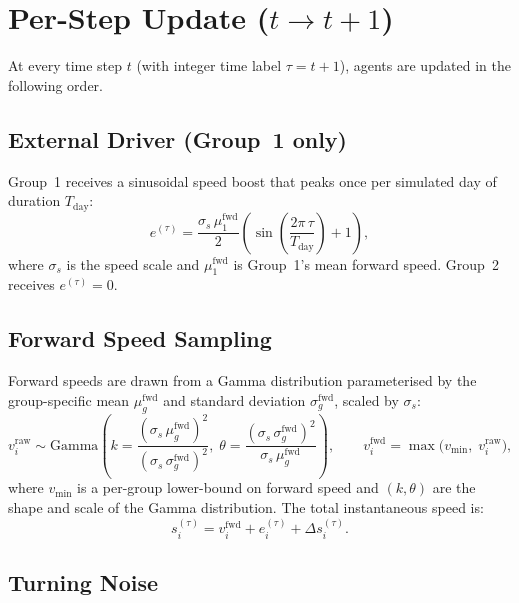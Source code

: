 \section{Per-Step Update ($t \to t+1$)}

At every time step $t$ (with integer time label $\tau = t + 1$), agents are
updated in the following order.

\subsection{External Driver (Group~1 only)}

Group~1 receives a sinusoidal speed boost that peaks once per simulated day
of duration $T_{\mathrm{day}}$:
%
\begin{equation}
  e^{(\tau)} = \frac{\sigma_s \, \mu_1^{\mathrm{fwd}}}{2}
               \left(\sin\!\left(\frac{2\pi\,\tau}{T_{\mathrm{day}}}\right) + 1\right),
\end{equation}
%
where $\sigma_s$ is the speed scale and
$\mu_1^{\mathrm{fwd}}$ is Group~1's mean forward speed.  Group~2 receives
$e^{(\tau)} = 0$.

\subsection{Forward Speed Sampling}

Forward speeds are drawn from a Gamma distribution parameterised by the
group-specific mean $\mu_g^{\mathrm{fwd}}$ and standard deviation
$\sigma_g^{\mathrm{fwd}}$, scaled by $\sigma_s$:
%
\begin{equation}\label{eq:gamma}
  v_i^{\mathrm{raw}} \sim \mathrm{Gamma}\!\left(
    k = \frac{(\sigma_s\,\mu_g^{\mathrm{fwd}})^2}{(\sigma_s\,\sigma_g^{\mathrm{fwd}})^2},\;
    \theta = \frac{(\sigma_s\,\sigma_g^{\mathrm{fwd}})^2}{\sigma_s\,\mu_g^{\mathrm{fwd}}}
  \right),
  \qquad
  v_i^{\mathrm{fwd}} = \max\!\bigl(v_{\min},\; v_i^{\mathrm{raw}}\bigr),
\end{equation}
%
where $v_{\min}$ is a per-group lower-bound on forward speed and
$(k, \theta)$ are the shape and scale of the Gamma distribution.  The total
instantaneous speed is:
%
\begin{equation}
  s_i^{(\tau)} = v_i^{\mathrm{fwd}} + e_i^{(\tau)} + \Delta s_i^{(\tau)}.
\end{equation}

\subsection{Turning Noise}

